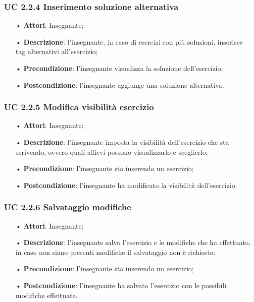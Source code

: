 \subsubsection{UC 2.2.4 Inserimento soluzione alternativa}
\begin{itemize}
	\item[•] \textbf{Attori}: Insegnante;
	\item[•] \textbf{Descrizione}: l'insegnante, in caso di esercizi con più soluzioni, inserisce tag alternativi all'esercizio;
	\item[•] \textbf{Precondizione}: l'insegnante visualizza la soluzione dell'esercizio;
	\item[•] \textbf{Postcondizione}: l'insegnante aggiunge una soluzione alternativa.
\end{itemize}


\subsubsection{UC 2.2.5 Modifica visibilità esercizio}
\begin{itemize}
	\item[•] \textbf{Attori}: Insegnante;
	\item[•] \textbf{Descrizione}: l'insegnante imposta la visibilità dell'esercizio che sta scrivendo, ovvero quali allievi possono visualizzarlo e sceglierlo;
	\item[•] \textbf{Precondizione}: l'insegnante sta inserendo un esercizio;
	\item[•] \textbf{Postcondizione}: l'insegnante ha modificato la visibilità dell'esercizio.
\end{itemize}


\subsubsection{UC 2.2.6 Salvataggio modifiche}
\begin{itemize}
	\item[•] \textbf{Attori}: Insegnante;
	\item[•] \textbf{Descrizione}: l'insegnante salva l'esercizio e le modifiche che ha effettuato, in caso non siano presenti modifiche il salvataggio non è richiesto;
	\item[•] \textbf{Precondizione}: l'insegnante sta inserendo un esercizio;
	\item[•] \textbf{Postcondizione}: l'insegnante ha salvato l'esercizio con le possibili modifiche effettuate.
\end{itemize}


